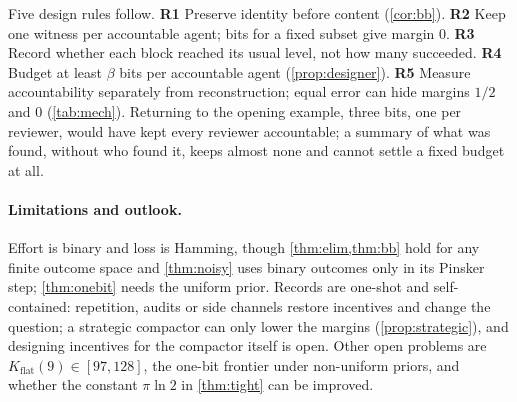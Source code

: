 \documentclass[sigconf,anonymous,acmthm=false]{acmart}
\theoremstyle{acmplain}
\theoremstyle{acmdefinition}
\newcommand{\Kflat}{K_{\mathrm{flat}}}
\begin{document}
Five design rules follow. \textbf{R1} Preserve identity before content (\cref{cor:bb}).
\textbf{R2} Keep one witness per accountable agent; bits for a fixed subset give margin 0.
\textbf{R3} Record whether each block reached its usual level, not how many succeeded. \textbf{R4} Budget at least $\beta$ bits per
accountable agent (\cref{prop:designer}). \textbf{R5} Measure accountability separately from
reconstruction; equal error can hide margins $1/2$ and 0 (\cref{tab:mech}). Returning to the
opening example, three bits, one per reviewer, would have kept every reviewer accountable;
a summary of what was found, without who found it, keeps almost none and cannot settle a fixed budget at all.

\paragraph{Limitations and outlook.} Effort is binary and loss is Hamming, though
\cref{thm:elim,thm:bb} hold for any finite outcome space and \cref{thm:noisy} uses binary
outcomes only in its Pinsker step; \cref{thm:onebit} needs the uniform prior. Records are
one-shot and self-contained: repetition, audits or side channels restore incentives and
change the question; a strategic compactor can only lower the margins
(\cref{prop:strategic}), and designing incentives for the compactor itself is open. Other open
problems are $\Kflat(9)\in[97,128]$, the one-bit frontier under non-uniform priors, and
whether the constant $\pi\ln2$ in \cref{thm:tight} can be improved.

\label{endbody}

\end{document}
